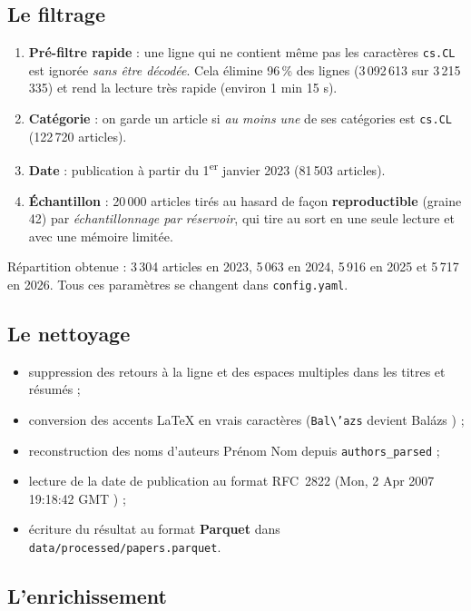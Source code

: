\documentclass[11pt,a4paper]{article}
\newcommand{\code}[1]{\texttt{#1}}
\begin{document}
\subsection{Le filtrage}

\begin{enumerate}
  \item \textbf{Pré-filtre rapide} : une ligne qui ne contient même pas les caractères
  \code{cs.CL} est ignorée \emph{sans être décodée}. Cela élimine 96\,\% des lignes
  (3\,092\,613 sur 3\,215\,335) et rend la lecture très rapide (environ 1 min 15 s).
  \item \textbf{Catégorie} : on garde un article si \emph{au moins une} de ses catégories
  est \code{cs.CL} (122\,720 articles).
  \item \textbf{Date} : publication à partir du 1\textsuperscript{er} janvier 2023
  (81\,503 articles).
  \item \textbf{Échantillon} : 20\,000 articles tirés au hasard de façon
  \textbf{reproductible} (graine 42) par \emph{échantillonnage par réservoir}, qui tire au
  sort en une seule lecture et avec une mémoire limitée.
\end{enumerate}

Répartition obtenue : 3\,304 articles en 2023, 5\,063 en 2024, 5\,916 en 2025 et 5\,717
en 2026. Tous ces paramètres se changent dans \code{config.yaml}.

\subsection{Le nettoyage}

\begin{itemize}
  \item suppression des retours à la ligne et des espaces multiples dans les titres et
  résumés ;
  \item conversion des accents LaTeX en vrais caractères (\code{Bal\textbackslash'azs}
  devient \og Balázs \fg{}) ;
  \item reconstruction des noms d'auteurs \og Prénom Nom \fg{} depuis
  \code{authors\_parsed} ;
  \item lecture de la date de publication au format RFC~2822
  (\og Mon, 2 Apr 2007 19:18:42 GMT \fg{}) ;
  \item écriture du résultat au format \textbf{Parquet} dans
  \code{data/processed/papers.parquet}.
\end{itemize}

\subsection{L'enrichissement}
\end{document}
